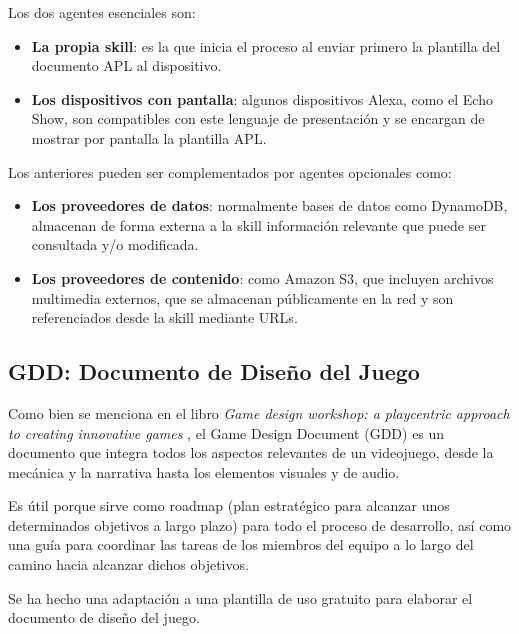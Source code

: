 Los dos agentes esenciales son:
\begin{itemize}
	\item \textbf{La propia skill}: es la que inicia el proceso al enviar primero la plantilla del documento APL al dispositivo.
	\item \textbf{Los dispositivos con pantalla}: algunos dispositivos Alexa, como el Echo Show, son compatibles con este lenguaje de presentación y se encargan de mostrar por pantalla la plantilla APL. 
\end{itemize}

Los anteriores pueden ser complementados por agentes opcionales como: 
\begin{itemize}
	\item \textbf{Los proveedores de datos}: normalmente bases de datos como DynamoDB, almacenan de forma externa a la skill información relevante que puede ser consultada y/o modificada.
	\item \textbf{Los proveedores de contenido}: como Amazon S3, que incluyen archivos multimedia externos, que se almacenan públicamente en la red y son referenciados desde la skill mediante URLs. 
\end{itemize}

\subsection{GDD: Documento de Diseño del Juego}

Como bien se menciona en el libro \textit{Game design workshop: a playcentric approach to creating innovative games} \parencite{fullerton2008game}, el Game Design Document (GDD) es un documento que integra todos los aspectos relevantes de un videojuego, desde la mecánica y la narrativa hasta los elementos visuales y de audio. 

Es útil porque sirve como roadmap (plan estratégico para alcanzar unos determinados objetivos a largo plazo) para todo el proceso de desarrollo, así como una guía para coordinar las tareas de los miembros del equipo a lo largo del camino hacia alcanzar dichos objetivos.

Se ha hecho una adaptación a una plantilla de uso gratuito para elaborar el documento de diseño del juego. 

